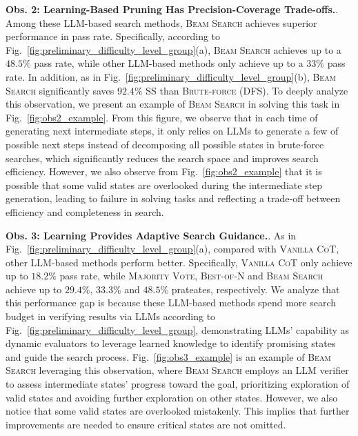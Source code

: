 \noindent \textbf{Obs. 2: Learning-Based Pruning Has Precision-Coverage Trade-offs.}. Among these LLM-based search methods, \textsc{Beam Search} achieves superior performance in pass rate. Specifically, according to Fig.~\ref{fig:preliminary_difficulty_level_group}(a), \textsc{Beam Search} achieves up to a $\num{48.5}\%$ pass rate, while other LLM-based methods only achieve up to a $\num{33}\%$ pass rate. In addition, as in Fig.~\ref{fig:preliminary_difficulty_level_group}(b), \textsc{Beam Search} significantly saves $92.4\%$ SS than \textsc{Brute-force (DFS)}. To deeply analyze this observation, we present an example of \textsc{Beam Search} in solving this task in Fig.~\ref{fig:obs2_example}. From this figure, we observe that in each time of generating next intermediate steps, it only relies on LLMs to generate a few of possible next steps instead of decomposing all possible states in brute-force searches, which significantly reduces the search space and improves search efficiency. However, we also observe from Fig.~\ref{fig:obs2_example} that it is possible that some valid states are overlooked during the intermediate step generation, leading to failure in solving tasks and reflecting a trade-off between efficiency and completeness in search.


\noindent \textbf{Obs. 3: Learning Provides Adaptive Search Guidance.}. 
As in Fig.~\ref{fig:preliminary_difficulty_level_group}(a), compared with \textsc{Vanilla CoT}, other LLM-based methods perform better. Specifically, \textsc{Vanilla CoT} only achieve up to $18.2\%$ pass rate, while \textsc{Majority Vote}, \textsc{Best-of-N} and \textsc{Beam Search} achieve up to $29.4\%$, $33.3\%$ and $48.5\%$ prateates, respectively. We analyze that this performance gap is because these LLM-based methods spend more search budget in verifying results via LLMs according to Fig.~\ref{fig:preliminary_difficulty_level_group}, demonstrating LLMs' capability as dynamic evaluators to leverage learned knowledge to identify promising states and guide the search process. Fig.~\ref{fig:obs3_example} is an example of \textsc{Beam Search} leveraging this observation, where \textsc{Beam Search} employs an LLM verifier to assess intermediate states' progress toward the goal, prioritizing exploration of valid states and avoiding further exploration on other states. However, we also notice that some valid states are overlooked mistakenly. This implies that further improvements are needed to ensure critical states are not omitted.

